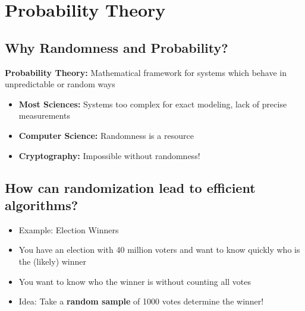 

\chapter{Probability Theory}

	\section{Why Randomness and Probability?}
		\textbf{Probability Theory:}
		Mathematical framework for systems which behave in unpredictable or random ways
		
		\begin{itemize}
			\item \textbf{Most Sciences:} Systems too complex for exact modeling, lack of precise measurements
			\item \textbf{Computer Science:} Randomness is a resource
			\item \textbf{Cryptography:} Impossible without randomness!
		\end{itemize}
	
	\section{How can randomization lead to efficient algorithms?}
		\begin{itemize}
			\item Example: Election Winners
			\item You have an election with 40 million voters and want to know quickly who is the (likely) winner
			\item You want to know who the winner is without counting all votes
			\item Idea: Take a \textbf{random sample} of 1000 votes determine the winner!
		\end{itemize}
	
